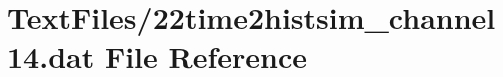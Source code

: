 \hypertarget{22time2histsim__channel14_8dat}{}\section{Text\+Files/22time2histsim\+\_\+channel14.dat File Reference}
\label{22time2histsim__channel14_8dat}
